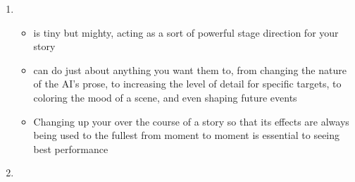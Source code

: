 ﻿\documentclass[Coomer-main.tex]{subfiles}
\begin{document}
\begin{enumerate}
\item {}

\begin{itemize}
\item \an is tiny but mighty, acting as a sort of powerful stage direction for your story
\item \ans can do just about anything you want them to, from changing the nature of the AI's prose, to increasing the level of detail for specific targets, to coloring the mood of a scene, and even shaping future events
\item Changing up your \an over the course of a story so that its effects are always being used to the fullest from moment to moment is essential to seeing best performance
\end{itemize}

\item {}


\end{enumerate}
\end{document}
